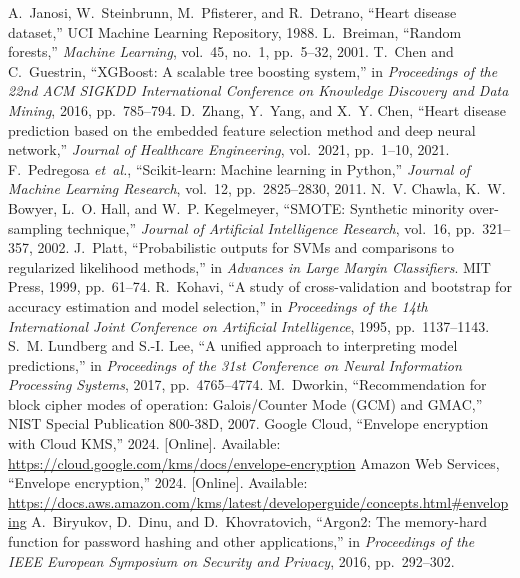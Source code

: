 \documentclass[12pt]{article}
\begin{document}
\begin{thebibliography}{00}
 A.~Janosi, W.~Steinbrunn, M.~Pfisterer, and R.~Detrano, ``Heart disease dataset,'' UCI Machine Learning Repository, 1988.
 L.~Breiman, ``Random forests,'' \emph{Machine Learning}, vol.~45, no.~1, pp.~5--32, 2001.
 T.~Chen and C.~Guestrin, ``XGBoost: A scalable tree boosting system,'' in \emph{Proceedings of the 22nd ACM SIGKDD International Conference on Knowledge Discovery and Data Mining}, 2016, pp.~785--794.
 D.~Zhang, Y.~Yang, and X.~Y. Chen, ``Heart disease prediction based on the embedded feature selection method and deep neural network,'' \emph{Journal of Healthcare Engineering}, vol.~2021, pp.~1--10, 2021.
 F.~Pedregosa \emph{et~al.}, ``Scikit-learn: Machine learning in Python,'' \emph{Journal of Machine Learning Research}, vol.~12, pp.~2825--2830, 2011.
 N.~V. Chawla, K.~W. Bowyer, L.~O. Hall, and W.~P. Kegelmeyer, ``SMOTE: Synthetic minority over-sampling technique,'' \emph{Journal of Artificial Intelligence Research}, vol.~16, pp.~321--357, 2002.
 J.~Platt, ``Probabilistic outputs for SVMs and comparisons to regularized likelihood methods,'' in \emph{Advances in Large Margin Classifiers}. MIT Press, 1999, pp.~61--74.
 R.~Kohavi, ``A study of cross-validation and bootstrap for accuracy estimation and model selection,'' in \emph{Proceedings of the 14th International Joint Conference on Artificial Intelligence}, 1995, pp.~1137--1143.
 S.~M. Lundberg and S.-I. Lee, ``A unified approach to interpreting model predictions,'' in \emph{Proceedings of the 31st Conference on Neural Information Processing Systems}, 2017, pp.~4765--4774.
 M.~Dworkin, ``Recommendation for block cipher modes of operation: Galois/Counter Mode (GCM) and GMAC,'' NIST Special Publication 800-38D, 2007.
 Google Cloud, ``Envelope encryption with Cloud KMS,'' 2024. [Online]. Available: \url{https://cloud.google.com/kms/docs/envelope-encryption}
 Amazon Web Services, ``Envelope encryption,'' 2024. [Online]. Available: \url{https://docs.aws.amazon.com/kms/latest/developerguide/concepts.html#enveloping}
 A.~Biryukov, D.~Dinu, and D.~Khovratovich, ``Argon2: The memory-hard function for password hashing and other applications,'' in \emph{Proceedings of the IEEE European Symposium on Security and Privacy}, 2016, pp.~292--302.

\end{thebibliography}
\end{document}
